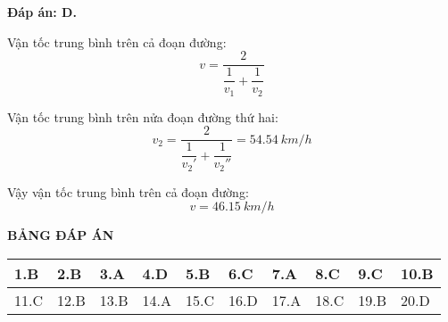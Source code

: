 \begin{enumerate}[label=\bfseries Câu \arabic*:]
{	}
	
	\hideall
	{\textbf{Đáp án: D.}
		
		Vận tốc trung bình trên cả đoạn đường:
		$$v=\dfrac{2}{\dfrac{1}{v_1}+\dfrac{1}{v_2}}$$
		
		Vận tốc trung bình trên nửa đoạn đường thứ hai:
		$$v_2=\dfrac{2}{\dfrac{1}{v_2'}+\dfrac{1}{v_2''}} = \SI{54.54}{km/h}$$
		
		Vậy vận tốc trung bình trên cả đoạn đường:
		$$v=\SI{46.15}{km/h}$$
	}
	
\end{enumerate}


\hideall
{
	\begin{center}
		\textbf{BẢNG ĐÁP ÁN}
	\end{center}
	\begin{center}
		\begin{tabular}{|m{2.8em}|m{2.8em}|m{2.8em}|m{2.8em}|m{2.8em}|m{2.8em}|m{2.8em}|m{2.8em}|m{2.8em}|m{2.8em}|}
			\hline
			1.B  & 2.B  & 3.A  & 4.D  & 5.B  & 6.C  & 7.A  & 8.C  & 9.C  & 10.B  \\
			\hline
			11.C  & 12.B  & 13.B  & 14.A  & 15.C  & 16.D  & 17.A  & 18.C  & 19.B  & 20.D  \\
			\hline
		
		\end{tabular}
	\end{center}
}
